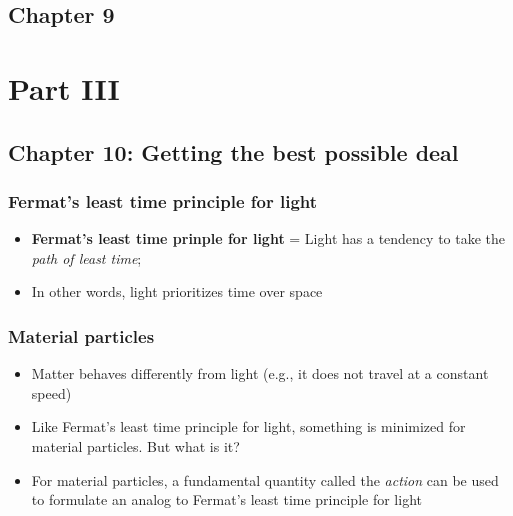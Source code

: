 \documentclass[a4paper]{article}
\begin{document}
    \subsection*{Chapter 9}
\section*{Part III}
    \subsection*{Chapter 10: Getting the best possible deal}
        \subsubsection*{Fermat's least time principle for light}
            \begin{itemize}
                \item \textbf{Fermat's least time prinple for light} = Light has a tendency to take the \textit{path of least time}; 
                \item In other words, light prioritizes time over space
            \end{itemize}
        \subsubsection*{Material particles}
            \begin{itemize}
                \item Matter behaves differently from light (e.g., it does not travel at a constant speed)
                \item Like Fermat's least time principle for light, something is minimized for material particles. But what is it?
                \item For material particles, a fundamental quantity called the \textit{action} can be used to formulate an analog to Fermat's least time principle for light
            \end{itemize}
\end{document}
